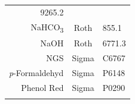 \documentclass[11pt,singlespacinge,twoside]{reedthesis} %
\theoremstyle{definition}
\theoremstyle{definition}
\theoremstyle{definition}
\theoremstyle{remark}
\begin{document}
\begin{longtable}[]{@{}rcl@{}}
\begin{minipage}[t]{0.29\columnwidth}
9265.2\strut
\end{minipage}\tabularnewline
\begin{minipage}[t]{0.29\columnwidth}\raggedleft
NaHCO\textsubscript{3}\strut
\end{minipage} & \begin{minipage}[t]{0.33\columnwidth}\centering
Roth\strut
\end{minipage} & \begin{minipage}[t]{0.29\columnwidth}\raggedright
855.1\strut
\end{minipage}\tabularnewline
\begin{minipage}[t]{0.29\columnwidth}\raggedleft
NaOH\strut
\end{minipage} & \begin{minipage}[t]{0.33\columnwidth}\centering
Roth\strut
\end{minipage} & \begin{minipage}[t]{0.29\columnwidth}\raggedright
6771.3\strut
\end{minipage}\tabularnewline
\begin{minipage}[t]{0.29\columnwidth}\raggedleft
NGS\strut
\end{minipage} & \begin{minipage}[t]{0.33\columnwidth}\centering
Sigma\strut
\end{minipage} & \begin{minipage}[t]{0.29\columnwidth}\raggedright
C6767\strut
\end{minipage}\tabularnewline
\begin{minipage}[t]{0.29\columnwidth}\raggedleft
\emph{p}-Formaldehyd\strut
\end{minipage} & \begin{minipage}[t]{0.33\columnwidth}\centering
Sigma\strut
\end{minipage} & \begin{minipage}[t]{0.29\columnwidth}\raggedright
P6148\strut
\end{minipage}\tabularnewline
\begin{minipage}[t]{0.29\columnwidth}\raggedleft
Phenol Red\strut
\end{minipage} & \begin{minipage}[t]{0.33\columnwidth}\centering
Sigma\strut
\end{minipage} & \begin{minipage}[t]{0.29\columnwidth}\raggedright
P0290\strut
\end{minipage}\tabularnewline
\begin{minipage}[t]{0.29\columnwidth}\raggedleft

\end{minipage}
\end{longtable}
\end{document}
